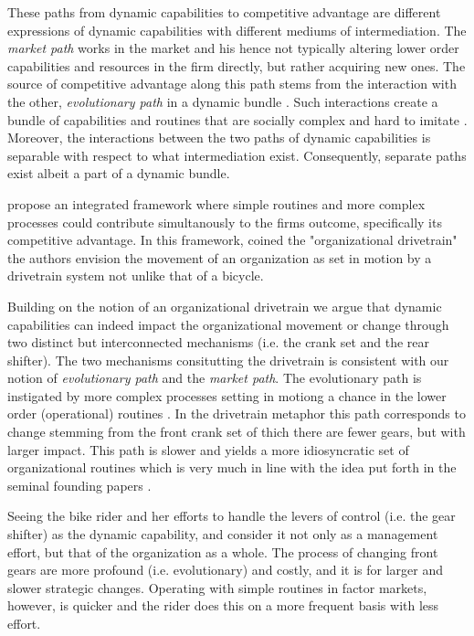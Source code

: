 \documentclass[review,fleqn]{elsarticle}\usepackage[]{graphicx}\usepackage[]{color}
\begin{document}
These paths from dynamic capabilities to competitive advantage are different expressions
of dynamic capabilities with different mediums of intermediation. The \emph{market path}
works in the market and his hence not typically altering lower order capabilities and
resources in the firm directly, but rather acquiring new ones. The source of competitive
advantage along this path stems from the interaction with the other, \emph{evolutionary
  path} in a dynamic bundle \citep{Peteraf2013}. Such interactions create a bundle of
capabilities and routines that are socially complex and hard to imitate
\citep[p. 320]{DiStefano2014}. Moreover, the interactions between the two paths of dynamic
capabilities is separable with respect to what intermediation exist. Consequently,
separate paths exist albeit a part of a dynamic bundle.

\cite{DiStefano2014} propose an integrated framework where simple routines and more
complex processes could contribute simultanously to the firms outcome, specifically its
competitive advantage. In this framework, coined the "organizational drivetrain" the
authors envision the movement of an organization as set in motion by a drivetrain system
not unlike that of a bicycle.

Building on the notion of an organizational drivetrain we argue that dynamic capabilities
can indeed impact the organizational movement or change through two distinct but
interconnected mechanisms (i.e. the crank set and the rear shifter). The two mechanisms
consitutting the drivetrain is consistent with our notion of \emph{evolutionary path} and the \emph{market path}. The
evolutionary path is instigated by more complex processes setting in motiong a chance in
the lower order (operational) routines \cite{Collis1994,Winter2003}. In the drivetrain
metaphor this path corresponds to change stemming from the front crank set of thich there
are fewer gears, but with larger impact. This path is slower
and yields a more idiosyncratic set of organizational routines which is very much in line
with the idea put forth in the seminal founding papers \citep{Teece1997,Winter2003}. 

Seeing the bike rider and her efforts to handle the levers of control (i.e. the gear
shifter) as the dynamic capability, and consider it not only as a management effort, but
that of the organization as a whole. The process of changing front gears are more profound
(i.e. evolutionary) and costly, and it is for larger and slower strategic
changes. Operating with simple routines in factor markets, however, is quicker and the
rider does this on a more frequent basis with less effort. 
\end{document}
